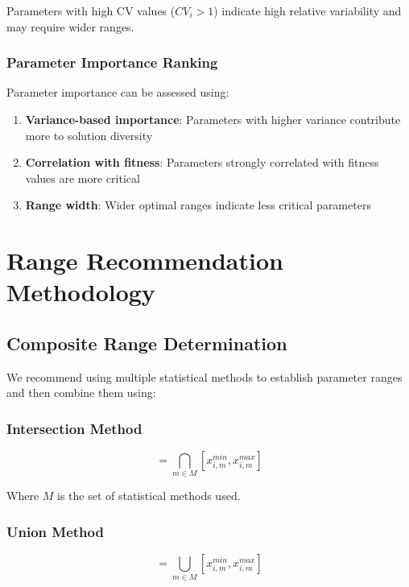 \documentclass[../main.tex]{subfiles}
\begin{document}
Parameters with high CV values ($CV_i > 1$) indicate high relative variability and may require wider ranges.

\subsubsection{Parameter Importance Ranking}

Parameter importance can be assessed using:

\begin{enumerate}
    \item \textbf{Variance-based importance}: Parameters with higher variance contribute more to solution diversity
    \item \textbf{Correlation with fitness}: Parameters strongly correlated with fitness values are more critical
    \item \textbf{Range width}: Wider optimal ranges indicate less critical parameters
\end{enumerate}

\section{Range Recommendation Methodology}

\subsection{Composite Range Determination}

We recommend using multiple statistical methods to establish parameter ranges and then combine them using:

\subsubsection{Intersection Method}

\begin{equation}
[x_i^{min}, x_i^{max}] = \bigcap_{m \in M} [x_{i,m}^{min}, x_{i,m}^{max}]
\label{eq:intersection}
\end{equation}

Where $M$ is the set of statistical methods used.

\subsubsection{Union Method}

\begin{equation}
[x_i^{min}, x_i^{max}] = \bigcup_{m \in M} [x_{i,m}^{min}, x_{i,m}^{max}]
\label{eq:union}
\end{equation}
\end{document}
